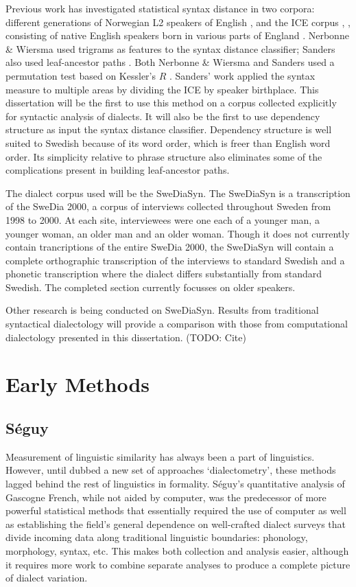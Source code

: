 \documentclass[11pt]{article}
\begin{document}
Previous work has investigated statistical syntax distance in two
corpora: different generations of Norwegian L2 speakers of English
\cite{nerbonne06}, and the ICE corpus \cite{sanders07},
\cite{sanders08b}, consisting of native English
speakers born in various parts of England \cite{nelson02}.
Nerbonne \& Wiersma used trigrams as features to the syntax distance
classifier; Sanders also used leaf-ancestor paths \cite{sampson00}.
Both Nerbonne \& Wiersma and Sanders used a
permutation test based on Kessler's $R$ \cite{kessler01}. Sanders'
work applied the syntax measure to multiple areas by dividing the
ICE by speaker birthplace. This dissertation will be the first to use
this method on a corpus collected explicitly for syntactic analysis of
dialects. It will also be the first to use dependency structure as
input the syntax distance classifier. Dependency structure is well
suited to Swedish because of its word order, which is freer than
English word order. Its simplicity relative to phrase structure also
eliminates some of the complications present in building leaf-ancestor
paths.

The dialect corpus used will be the SweDiaSyn.
The SweDiaSyn is a transcription of the SweDia 2000, a corpus of
interviews collected throughout Sweden from 1998 to 2000. At each
site, interviewees were one each of a younger man, a younger woman, an
older man and an older woman. Though it does not currently contain
trancriptions of the entire SweDia 2000, the SweDiaSyn will
contain a complete orthographic transcription of the interviews to
standard Swedish and a phonetic transcription where the dialect
differs substantially from standard Swedish. The completed section
currently focusses on older speakers.

Other research is being conducted on SweDiaSyn. Results from traditional
syntactical dialectology will provide a comparison with those from
computational dialectology presented in this dissertation. (TODO:
Cite)


\section{Early Methods}

\subsection{S\'eguy}

Measurement of linguistic similarity has always been a part of
linguistics. However, until  dubbed a new set of
approaches `dialectometry', these methods lagged behind the rest of
linguistics in formality. S\'eguy's quantitative analysis
of Gascogne French, while not aided by computer, was the predecessor
of more powerful statistical methods that essentially required the use
of computer as well as establishing the field's general dependence on
well-crafted dialect surveys that divide incoming data along
traditional linguistic boundaries: phonology, morphology, syntax, etc.
This makes both collection and analysis easier, although it requires
more work to combine separate analyses to produce a complete picture of dialect
variation.
\end{document}

